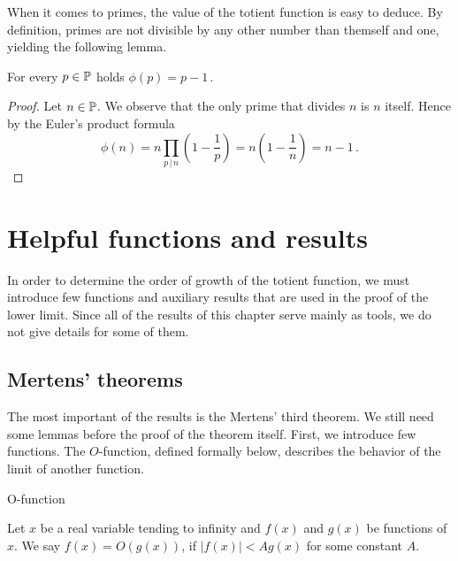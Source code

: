 \documentclass{article}
\begin{document}
When it comes to primes, the value of the totient function is easy to deduce. By definition, primes are not divisible by any other number than themself and one, yielding the following lemma.

\begin{lemma}
\label{thm:phiprime}
For every $p \in \mathbb{P}$ holds $\phi(p) = p-1$\,.

\begin{proof}


Let $n\in\mathbb{P}$. We observe that the only prime that divides $n$ is $n$ itself. Hence by the Euler's product formula
\begin{equation*}
    \phi(n) = n \prod_{p \,\vert\, n} \left(1 - \frac{1}{p}\right) = n\left(1-\frac{1}{n}\right) = n-1\,.
\end{equation*}

\end{proof}

\end{lemma}

\section{Helpful functions and results}
\label{apujutut}

In order to determine the order of growth of the totient function, we must introduce few functions and auxiliary results that are used in the proof of the lower limit. Since all of the results of this chapter serve mainly as tools, we do not give details for some of them.

\subsection{Mertens' theorems}

The most important of the results is the Mertens' third theorem. We still need some lemmas before the proof of the theorem itself. First, we introduce few functions. The $O$-function, defined formally below, describes the behavior of the limit of another function.

\begin{definition}
O-function

Let $x$ be a real variable tending to infinity and $f(x)$ and $g(x)$ be functions of $x$. We say $f(x)=O(g(x))$, if $\vert f(x) \vert < Ag(x)$ for some constant $A$.
\end{definition}
\end{document}
